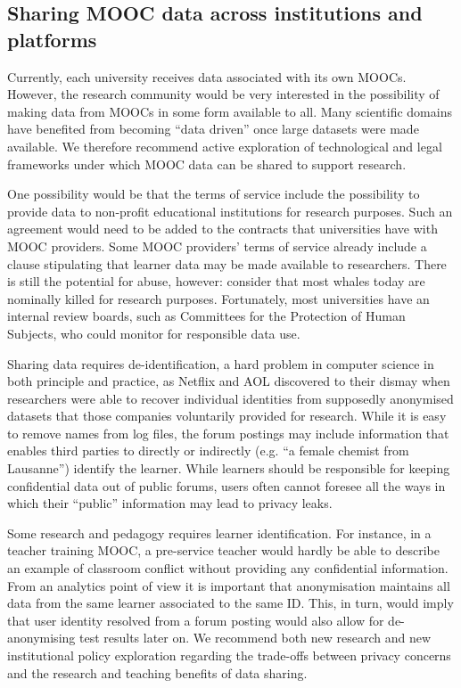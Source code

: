 \subsection{Sharing MOOC data across institutions and platforms}

Currently, each university receives data associated with its own MOOCs.
However, the research
community would be very interested in the possibility of making data
from MOOCs in some form available to all. Many scientific domains have
benefited from becoming ``data driven'' once large datasets were made
available.  We therefore recommend active exploration of technological
and legal frameworks under which MOOC data can be shared to support
research. 

One possibility would be that the terms of service include the
possibility to provide data to non-profit educational institutions for
research purposes. Such an agreement would need to be added to the
contracts that universities have with MOOC providers.
Some MOOC providers' terms of service already include a clause
stipulating that learner data may be made available to researchers.
There is still the potential for abuse, however: consider that most
whales today are nominally killed for research purposes.  Fortunately,
most 
universities have an internal review boards, such as Committees for the
Protection of Human Subjects, who could monitor for responsible data use.

Sharing data requires de-identification,
a hard problem in computer science in both principle and
practice, as Netflix and AOL discovered to their dismay when researchers
were able to recover individual identities from supposedly anonymised
datasets that those companies voluntarily provided for research.
While it is easy to remove names from log files, the forum
postings may include information that enables third parties to directly
or indirectly
(e.g. ``a female chemist from Lausanne'') identify the learner. 
While learners should be responsible for keeping confidential data out
of public forums, users often cannot foresee all the ways in which their
``public'' information may lead to 
privacy leaks.


Some research and pedagogy requires learner identification.
For instance, in a teacher training MOOC, a pre-service
teacher would hardly be able to describe an example of classroom
conflict without providing any confidential information. From an
analytics point of view it is important that anonymisation maintains all
data from the same learner associated to the same ID. This, in turn,
would imply that user identity resolved from a forum posting would also
allow for de-anonymising test results later on. 
We recommend both new
research and new institutional policy exploration regarding the
trade-offs between privacy concerns and 
the research and teaching benefits of data sharing.

